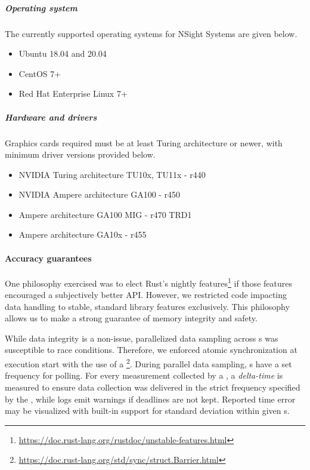 \subparagraph{Operating system}
The currently supported operating systems for NSight Systems are given below.
\begin{itemize}
    \item Ubuntu 18.04 and 20.04
    \item CentOS 7+
    \item Red Hat Enterprise Linux 7+
\end{itemize}

\subparagraph{Hardware and drivers}
Graphics cards required must be at least Turing architecture or newer, with minimum driver versions provided below.
\begin{itemize}
    \item NVIDIA Turing architecture TU10x, TU11x - r440
    \item NVIDIA Ampere architecture GA100 - r450
    \item Ampere architecture GA100 MIG - r470 TRD1
    \item Ampere architecture GA10x - r455
\end{itemize}


\paragraph{Accuracy guarantees}
One philosophy exercised was to elect Rust's nightly features\footnote{\href{https://doc.rust-lang.org/rustdoc/unstable-features.html}{https://doc.rust-lang.org/rustdoc/unstable-features.html}} if those features encouraged a subjectively better API. However, we restricted code impacting data handling to stable, standard library features exclusively. This philosophy allows us to make a strong guarantee of memory integrity and safety.\medskip

While data integrity is a non-issue, parallelized data sampling across s was susceptible to race conditions. Therefore, we enforced atomic synchronization at execution start with the use of a \footnote{\href{
https://doc.rust-lang.org/std/sync/struct.Barrier.html}{
https://doc.rust-lang.org/std/sync/struct.Barrier.html}}. During parallel data sampling, s have a set frequency for polling. For every measurement collected by a , a \emph{delta-time} is measured to ensure data collection was delivered in the strict frequency specified by the , while logs emit warnings if deadlines are not kept. Reported time error may be visualized with built-in support for standard deviation within given s.\medskip


